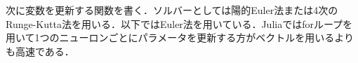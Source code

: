 次に変数を更新する関数を書く．ソルバーとしては陽的Euler法または4次のRunge-Kutta法を用いる．以下ではEuler法を用いている．Juliaではforループを用いて1つのニューロンごとにパラメータを更新する方がベクトルを用いるよりも高速である．